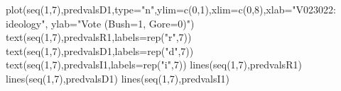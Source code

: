 \begin{Schunk}
\begin{Sinput}
 plot(seq(1,7),predvalsD1,type="n",ylim=c(0,1),xlim=c(0,8),xlab="V023022: ideology", ylab="Vote (Bush=1, Gore=0)") 
 text(seq(1,7),predvalsR1,labels=rep("r",7))
 text(seq(1,7),predvalsD1,labels=rep("d",7))
 text(seq(1,7),predvalsI1,labels=rep("i",7))
 lines(seq(1,7),predvalsR1)
 lines(seq(1,7),predvalsD1)
 lines(seq(1,7),predvalsI1)
\end{Sinput}
\end{Schunk}
